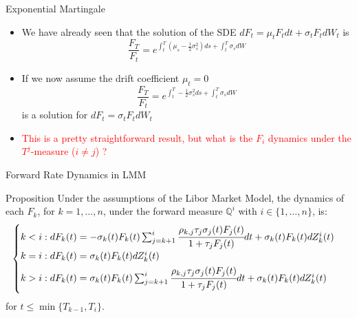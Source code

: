 \documentclass{beamer}
\begin{document}
\begin{frame}{Exponential Martingale}
  \begin{itemize}
	  \item<1-> We have already seen that the solution of the SDE $dF_t=\mu_t F_t dt + \sigma_t F_t dW_t$ is
	    \begin{equation*}
		      \frac{F_T}{F_t} = e^{\int_t^T(\mu_s -\frac{1}{2}\sigma_s^2)ds+\int_t^T\sigma_s dW}
		    \end{equation*}
	  \item<2-> If we now assume the drift coefficient $\mu_t=0$ 
	    \begin{equation*}
		    \frac{F_T}{F_t} = e^{\int_t^T-\frac{1}{2}\sigma_s^2 ds+\int_t^T\sigma_s dW}
	    \end{equation*}
	  is a solution for $dF_t=\sigma_t F_tdW_t$
	  \item<3-> \textcolor{red}{This is a pretty straightforward result, but what is the $F_i$ dynamics under the $T^j$-measure ($i\neq j$) ?}
	  \end{itemize}
\end{frame}

\begin{frame}{Forward Rate Dynamics in LMM}
  \begin{block}{Proposition}
    Under the assumptions of the Libor Market Model, the dynamics of each $F_k$, for $k = 1,\ldots, n$, under the forward measure $\mathbb{Q}^i$ with $i \in \{1,\ldots, n\}$, is:
    \begin{equation}
      \begin{cases}
	k < i: dF_k(t) = -\sigma_k(t)F_k(t)\sum_{j=k+1}^i\cfrac{\rho_{k,j}\tau_j\sigma_j(t)F_j(t)}{1+\tau_jF_j(t)}dt + \sigma_k(t)F_k(t)dZ^i_k(t) \\ \vspace{0.1cm}
	k = i : dF_k(t) = \sigma_k(t)F_k(t)dZ_k^i(t) \\
	\vspace{0.1cm}
	k > i : dF_k(t) = \sigma_k(t)F_k(t)\sum_{j=k+1}^i\cfrac{\rho_{k,j}\tau_j\sigma_j(t)F_j(t)}{1+\tau_jF_j(t)}dt + \sigma_k(t)F_k(t)dZ^i_k(t)		
      \end{cases}
  	\label{eq:forward_rat_dynamics_lfm}
    \end{equation}
    for $t \le \min\{T_{k-1}, T_i\}$.
  \end{block}
\end{frame}
\end{document}
